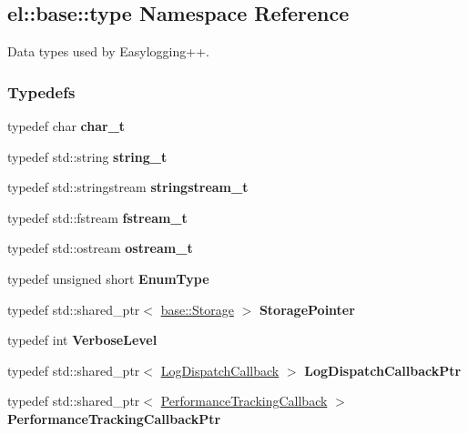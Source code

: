 \hypertarget{a00189}{}\subsection{el\+:\+:base\+:\+:type Namespace Reference}
\label{a00189}


Data types used by Easylogging++.  


\subsubsection*{Typedefs}
\begin{DoxyCompactItemize}
\item 
\hypertarget{a00189_ae9fe1ba101c2444b8cad9a2484b54907}{}typedef char {\bfseries char\+\_\+t}\label{a00189_ae9fe1ba101c2444b8cad9a2484b54907}

\item 
\hypertarget{a00189_a67e406cd213c231f1d135b5a4eda64b5}{}typedef std\+::string {\bfseries string\+\_\+t}\label{a00189_a67e406cd213c231f1d135b5a4eda64b5}

\item 
\hypertarget{a00189_a3492908c4b80f97b6c4b346d394f1302}{}typedef std\+::stringstream {\bfseries stringstream\+\_\+t}\label{a00189_a3492908c4b80f97b6c4b346d394f1302}

\item 
\hypertarget{a00189_a620c830ead75d26b45c060c211ee2685}{}typedef std\+::fstream {\bfseries fstream\+\_\+t}\label{a00189_a620c830ead75d26b45c060c211ee2685}

\item 
\hypertarget{a00189_a74ea109bf34d1c44926837fb0830f445}{}typedef std\+::ostream {\bfseries ostream\+\_\+t}\label{a00189_a74ea109bf34d1c44926837fb0830f445}

\item 
\hypertarget{a00189_afb892a99b7545bf6e45c1e1d84af2ec9}{}typedef unsigned short {\bfseries Enum\+Type}\label{a00189_afb892a99b7545bf6e45c1e1d84af2ec9}

\item 
\hypertarget{a00189_a3c34822c3825018aca1526f2289b7976}{}typedef std\+::shared\+\_\+ptr$<$ \hyperlink{a00086}{base\+::\+Storage} $>$ {\bfseries Storage\+Pointer}\label{a00189_a3c34822c3825018aca1526f2289b7976}

\item 
\hypertarget{a00189_a3f79fa74639a13c32f794ba074fe7fb4}{}typedef int {\bfseries Verbose\+Level}\label{a00189_a3f79fa74639a13c32f794ba074fe7fb4}

\item 
\hypertarget{a00189_a887283511935c7a6d5ca99df8099f33f}{}typedef std\+::shared\+\_\+ptr$<$ \hyperlink{a00043}{Log\+Dispatch\+Callback} $>$ {\bfseries Log\+Dispatch\+Callback\+Ptr}\label{a00189_a887283511935c7a6d5ca99df8099f33f}

\item 
\hypertarget{a00189_a01a715419060d65c31b71fd8d067abdd}{}typedef std\+::shared\+\_\+ptr$<$ \hyperlink{a00066}{Performance\+Tracking\+Callback} $>$ {\bfseries Performance\+Tracking\+Callback\+Ptr}\label{a00189_a01a715419060d65c31b71fd8d067abdd}

\end{DoxyCompactItemize}
